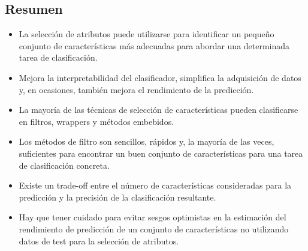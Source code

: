 \subsection{Resumen}
\begin{itemize}
\item La selección de atributos puede utilizarse para identificar un pequeño conjunto de características más adecuadas para abordar una determinada tarea de clasificación.
\item Mejora la interpretabilidad del clasificador, simplifica la adquisición de datos y, en ocasiones, también mejora el rendimiento de la predicción.
\item La mayoría de las técnicas de selección de características pueden clasificarse en filtros, wrappers y métodos embebidos.
\item Los métodos de filtro son sencillos, rápidos y, la mayoría de las veces, suficientes para encontrar un buen conjunto de características para una tarea de clasificación concreta.
\item Existe un trade-off entre el número de características consideradas para la predicción y la precisión de la clasificación resultante.
\item Hay que tener cuidado para evitar sesgos optimistas en la estimación del rendimiento de predicción de un conjunto de características no utilizando datos de test para la selección de atributos.
\end{itemize}
